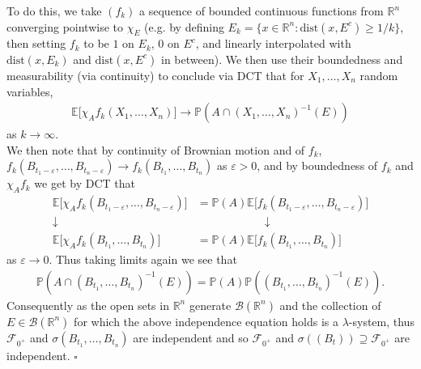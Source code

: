 \documentclass{tikzposter} %
\begin{document}
\begin{columns}
{    To do this, we take $(f_{k})$ a sequence of bounded continuous functions from $\mathbb{R}^{n}$ converging pointwise to $\chi_{E}$ (e.g. by defining $E_{k} = \{x \in \mathbb{R}^{n} : \mathrm{dist}(x,E^{c}) \ge 1/k\}$, then setting $f_{k}$ to be $1$ on $E_{k}$, $0$ on $E^{c}$, and linearly interpolated with $\mathrm{dist}(x,E_{k})$ and $\mathrm{dist}(x,E^{c})$ in between). We then use their boundedness and measurability (via continuity) to conclude via DCT that for $X_{1},\dots,X_{n}$ random variables,
    \begin{align*}
      \mathbb{E}\big[\chi_{A}f_{k}(X_{1},\dots,X_{n})\big] \to \mathbb{P}(A \cap (X_{1},\dots,X_{n})^{-1}(E))
    \end{align*}
    as $k \to \infty$. \\

    We then note that by continuity of Brownian motion and of $f_{k}$, $f_{k}(B_{t_{1}-\varepsilon}, \dots,B_{t_{n}-\varepsilon}) \to f_{k}(B_{t_{1}},\dots,B_{t_{n}})$ as $\varepsilon > 0$, and by boundedness of $f_{k}$ and $\chi_{A}f_{k}$ we get by DCT that
    \begin{align*}
      \mathbb{E}\big[\chi_{A}f_{k}(B_{t_{1}-\varepsilon},\dots,B_{t_{n}-\varepsilon})\big] &= \mathbb{P}(A)\mathbb{E}\big[f_{k}(B_{t_{1}-\varepsilon},\dots,B_{t_{n}-\varepsilon})\big] \\
      \downarrow\quad\quad\quad\quad\quad & \quad\quad\quad\quad\quad\quad\downarrow \\
      \mathbb{E}\big[\chi_{A}f_{k}(B_{t_{1}},\dots,B_{t_{n}})\big] &= \mathbb{P}(A)\mathbb{E}\big[f_{k}(B_{t_{1}},\dots,B_{t_{n}})\big]
    \end{align*}
    as $\varepsilon \to 0$. Thus taking limits again we see that
    \begin{align*}
      \mathbb{P}(A \cap (B_{t_{1}},\dots,B_{t_{n}})^{-1}(E)) = \mathbb{P}(A)\mathbb{P}((B_{t_{1}},\dots,B_{t_{n}})^{-1}(E)).
    \end{align*}
    Consequently as the open sets in $\mathbb{R}^{n}$ generate $\mathcal{B}(\mathbb{R}^{n})$ and the collection of $E \in \mathcal{B}(\mathbb{R}^{n})$ for which the above independence equation holds is a $\lambda$-system, thus $\mathcal{F}_{0^{+}}$ and $\sigma(B_{t_{1}},\dots,B_{t_{n}})$ are independent and so $\mathcal{F}_{0^{+}}$ and $\sigma((B_{t})) \supseteq \mathcal{F}_{0^{+}}$ are independent. $\square$ \\

}
\end{columns}
\end{document}
